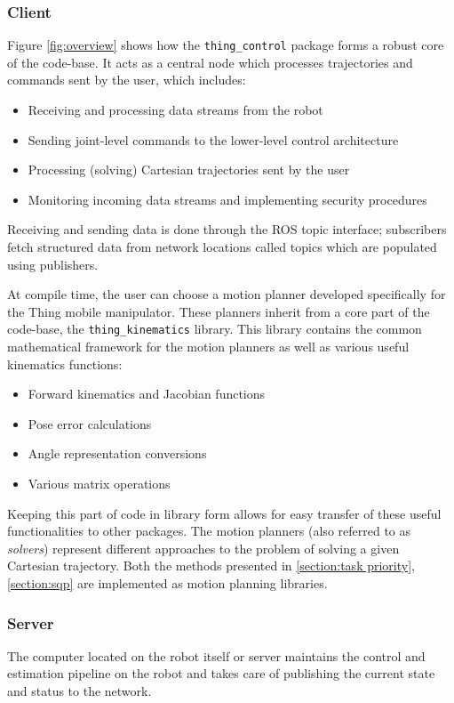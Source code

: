 \documentclass[times, utf8, diplomski, english]{fer}
\begin{document}
\subsubsection{Client}
Figure \ref{fig:overview} shows how the \verb|thing_control| package forms a robust core of the code-base.
It acts as a central node which processes trajectories and commands sent by the user, which includes:
\begin{itemize}
  \item Receiving and processing data streams from the robot
  \item Sending joint-level commands to the lower-level control architecture
  \item Processing (solving) Cartesian trajectories sent by the user
  \item Monitoring incoming data streams and implementing security procedures
\end{itemize}
Receiving and sending data is done through the ROS topic interface; subscribers fetch structured data from network locations called topics which are populated using publishers.

At compile time, the user can choose a motion planner developed specifically for the Thing mobile manipulator.
These planners inherit from a core part of the code-base, the \verb|thing_kinematics| library.
This library contains the common mathematical framework for the motion planners as well as various useful kinematics functions:
\begin{itemize}
  \item Forward kinematics and Jacobian functions
  \item Pose error calculations
  \item Angle representation conversions
  \item Various matrix operations
\end{itemize}
Keeping this part of code in library form allows for easy transfer of these useful functionalities to other packages.
The motion planners (also referred to as \textit{solvers}) represent different approaches to the problem of solving a given Cartesian trajectory.
Both the methods presented in \ref{section:task priority}, \ref{section:sqp} are implemented as motion planning libraries.

\subsubsection{Server}
The computer located on the robot itself or server maintains the control and estimation pipeline on the robot and takes care of publishing the current state and status to the network.
\end{document}
